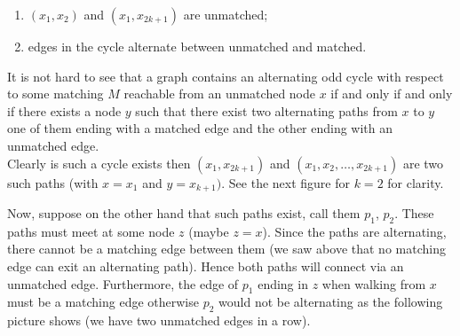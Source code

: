 \documentclass[a4paper,10pt]{article}
\begin{document}
\begin{enumerate}
 \item $(x_1, x_2)$ and $(x_1, x_{2k + 1})$ are unmatched;
 \item edges in the cycle alternate between unmatched and matched.
\end{enumerate}

It is not hard to see that a graph contains an alternating odd cycle with
respect to some matching $M$ reachable from an
unmatched node $x$ if and only if and only if there exists a node $y$
such that there exist two alternating paths from $x$ to $y$ one of them
ending with a matched edge and the other ending with an unmatched edge. \\

Clearly is such a cycle exists then $(x_1, x_{2k + 1})$ and
$(x_1, x_2, \ldots, x_{2k + 1})$ are two such paths (with $x = x_1$ and $y = x_{k +1})$. 
See the next figure for $k = 2$ for clarity.

\begin{center}
\end{center}

Now, suppose on the other hand that such paths exist, call them $p_1$, $p_2$.
These paths must meet at some node $z$ (maybe $z = x$). Since
the paths are alternating, there cannot be a matching edge between them (we saw
above that no matching edge can exit an alternating path). Hence both paths
will connect via an unmatched edge. Furthermore, the edge of $p_1$
ending in $z$ when walking from $x$ must be a matching edge otherwise
$p_2$ would not be alternating as the following picture shows
(we have two unmatched edges in a row).
\end{document}
